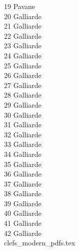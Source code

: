 \documentclass[11pt]{book}
\begin{document}
19 Pavane \dotfill \pageref{19_pavane} \\
20 Galliarde \dotfill \pageref{20_galliarde} \\
21 Galliarde\dotfill \pageref{21_galliarde} \\
22 Galliarde\dotfill \pageref{22_galliarde} \\
23 Galliarde\dotfill \pageref{23_galliarde} \\
24 Galliarde\dotfill \pageref{24_galliarde} \\
25 Galliarde\dotfill \pageref{25_galliarde} \\
26 Galliarde\dotfill \pageref{26_galliarde} \\
27 Galliarde\dotfill \pageref{27_galliarde} \\
28 Galliarde\dotfill \pageref{28_galliarde} \\
29 Galliarde\dotfill \pageref{29_galliarde} \\
30 Galliarde\dotfill \pageref{30_galliarde} \\
31 Galliarde\dotfill \pageref{31_galliarde} \\
32 Galliarde\dotfill \pageref{32_galliarde} \\
33 Galliarde\dotfill \pageref{33_galliarde} \\
34 Galliarde\dotfill \pageref{34_galliarde} \\
35 Galliarde\dotfill \pageref{35_galliarde} \\
36 Galliarde\dotfill \pageref{36_galliarde} \\
37 Galliarde\dotfill \pageref{37_galliarde} \\
38 Galliarde\dotfill \pageref{38_galliarde} \\
39 Galliarde\dotfill \pageref{39_galliarde} \\
40 Galliarde\dotfill \pageref{40_galliarde} \\
41 Galliarde\dotfill \pageref{41_galliarde} \\
42 Galliarde\dotfill \pageref{42_galliarde} \\
%
%
\clearpage
 {clefs_modern_pdfs.tex}
\end{document}
